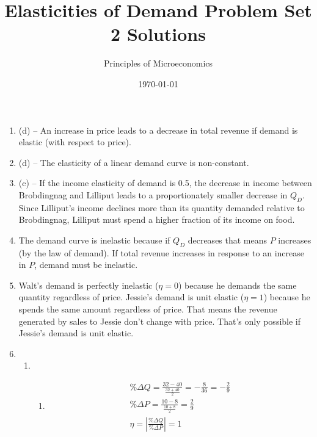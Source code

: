 \documentclass{article}
\title{Elasticities of Demand Problem Set 2 Solutions}
\author{Principles of Microeconomics}
\date{\today}
\begin{document}
\maketitle

\begin{enumerate}

\item (d) -- An increase in price leads to a decrease in total revenue if demand is elastic (with respect to price).

\item (d) -- The elasticity of a linear demand curve is non-constant.

\item (c) -- If the income elasticity of demand is 0.5, the decrease in income between Brobdingnag and Lilliput leads to a proportionately smaller decrease in $Q_D$. Since Lilliput's income declines more than its quantity demanded relative to Brobdingnag, Lilliput must spend a higher fraction of its income on food. 

\item The demand curve is inelastic because if $Q_D$ decreases that means $P$ increases (by the law of demand). If total revenue increases in response to an increase in $P$, demand must be inelastic.

\item Walt's demand is perfectly inelastic ($\eta = 0$) because he demands the same quantity regardless of price. Jessie's demand is unit elastic ($\eta = 1$) because he spends the same amount regardless of price. That means  the revenue generated by sales to Jessie don't change with price. That's only possible if Jessie's demand is unit elastic. 

\item

	\begin{enumerate}
	
	\item
	
		\begin{enumerate}
		
		\item 
		\begin{gather*}
		\% \Delta Q = \frac{32 - 40}{\frac{32 + 40}{2}} = -\frac{8}{36} = -\frac{2}{9} \\
		\% \Delta P = \frac{10 - 8}{\frac{10 + 8}{2}} = \frac{2}{9} \\
		\eta = \left| \frac{\% \Delta Q}{\% \Delta P} \right| = 1
		\end{gather*}
		

\end{enumerate}
\end{enumerate}
\end{enumerate}
\end{document}
